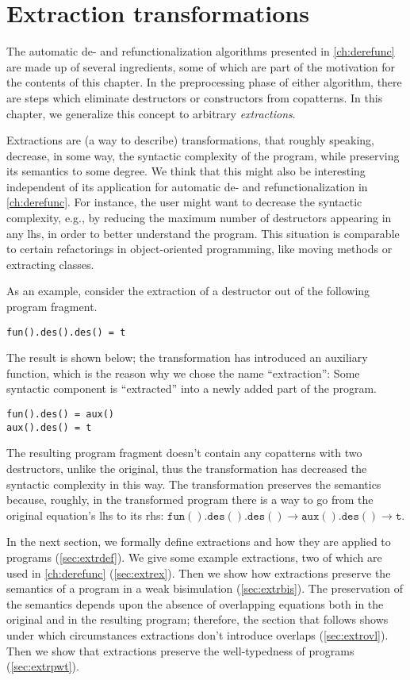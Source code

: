 \chapter{Extraction transformations}
\label{ch:extr}

The automatic de- and refunctionalization algorithms presented in \autoref{ch:derefunc} are made up of several ingredients, some of which are part of the motivation for the contents of this chapter. In the preprocessing phase of either algorithm, there are steps which eliminate destructors or constructors from copatterns. In this chapter, we generalize this concept to arbitrary \textit{extractions}.

Extractions are (a way to describe) transformations, that roughly speaking, decrease, in some way, the syntactic complexity of the program, while preserving its semantics to some degree. We think that this might also be interesting independent of its application for automatic de- and refunctionalization in \autoref{ch:derefunc}. For instance, the user might want to decrease the syntactic complexity, e.g., by reducing the maximum number of destructors appearing in any lhs, in order to better understand the program. This situation is comparable to certain refactorings in object-oriented programming, like moving methods or extracting classes.

As an example, consider the extraction of a destructor out of the following program fragment.
\begin{lstlisting}
fun().des().des() = t
\end{lstlisting}
The result is shown below; the transformation has introduced an auxiliary function, which is the reason why we chose the name ``extraction'': Some syntactic component is ``extracted'' into a newly added part of the program.
\begin{lstlisting}
fun().des() = aux()
aux().des() = t
\end{lstlisting}
The resulting program fragment doesn't contain any copatterns with two destructors, unlike the original, thus the transformation has decreased the syntactic complexity in this way. The transformation preserves the semantics because, roughly, in the transformed program there is a way to go from the original equation's lhs to its rhs: $\mathtt{fun().des().des()} \longrightarrow \mathtt{aux().des()} \longrightarrow \mathtt{t}$.

In the next section, we formally define extractions and how they are applied to programs (\autoref{sec:extrdef}). We give some example extractions, two of which are used in \autoref{ch:derefunc} (\autoref{sec:extrex}). Then we show how extractions preserve the semantics of a program in a weak bisimulation (\autoref{sec:extrbis}). The preservation of the semantics depends upon the absence of overlapping equations both in the original and in the resulting program; therefore, the section that follows shows under which circumstances extractions don't introduce overlaps (\autoref{sec:extrovl}). Then we show that extractions preserve the well-typedness of programs (\autoref{sec:extrpwt}).

